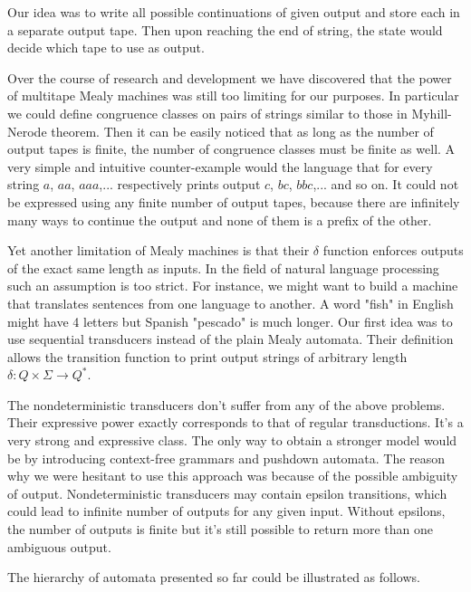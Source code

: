 Our idea was to write all possible continuations of given output and store each in a separate output tape. Then upon reaching the end of string, the state would decide which tape to use as output. 

Over the course of research and development we have discovered that the power of multitape Mealy machines was still too limiting for our purposes. In particular we could define congruence classes on pairs of strings similar to those in Myhill-Nerode theorem\cite{sipser}. Then it can be easily noticed that as long as the number of output tapes is finite, the number of congruence classes must be finite as well. A very simple and intuitive counter-example would the language that for every string $a$, $aa$, $aaa$,... respectively prints output $c$, $bc$, $bbc$,... and so on. It could not be expressed using any finite number of output tapes, because there are infinitely many ways to continue the output and none of them is a prefix of the other.  



Yet another limitation of Mealy machines is that their $\delta$ function enforces outputs of the exact same length as inputs. In the field of natural language processing such an assumption is too strict. For instance, we might want to 
build a machine that translates sentences from one language to another. A word "fish" in English might have 4 letters but Spanish "pescado" is much longer. Our first idea was to use sequential transducers instead of the plain Mealy automata. Their definition allows the transition function to print output strings of arbitrary length $\delta:Q\times \Sigma \rightarrow Q^*$.  


The nondeterministic transducers\cite{MOHRI}\cite{MOHRI2}\cite{MOHRI3}  don't suffer from any of the above problems. Their expressive power exactly corresponds to that of regular transductions. It's a very strong and expressive class. The only way to obtain a stronger model would be by introducing context-free grammars and pushdown automata. The reason why we were hesitant to use this approach was because of the possible ambiguity of output\cite{Marie-Pierre}. Nondeterministic transducers may contain epsilon transitions, which could lead to infinite number of outputs\cite{MendozaDrosik2020MultitapeAA} for any given input. Without epsilons, the number of outputs is finite but it's still possible to return more than one ambiguous output. 


The hierarchy of automata presented so far could be illustrated as follows.
\begin{center}
\end{center}



